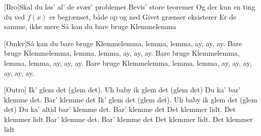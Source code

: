 \documentclass[a4paper,11pt]{article}
\begin{document}
\begin{song}
    [Bro]Skal du løs' al' de svær' problemer 
Bevis' store teoremer 
Og der kun en ting du ved
$f(x)$ er begrænset, både op og ned
Givet grænser eksisterer
Er de samme, ikke mere
Så kan du bare bruge Klemmelemma

    [Omkv]Så kan du bare bruge Klemmelemma, lemma, lemma, ay, ay, ay.
Bare bruge Klemmelemma, lemma, lemma, ay, ay, ay.
Bare bruge Klemmelemma, lemma, lemma, ay, ay, ay.
Bare bruge Klemmelemma, lemma, lemma, ay, ay, ay, ay, ay, ay.

[Outro]
Ik' glem det (glem det). Uh baby ik glem det (glem det)
Du ka' bar' klemme det. Bar' klemme det
Ik' glem det (glem det). Uh baby ik glem det (glem det)
Du ka' altid bar' klemme det. Bar' klemme det
Det klemmer lidt. Det klemmer lidt
Bar' klemme det. Bar' klemme det
Det klemmer lidt. Det klemmer lidt


\end{song}
\end{document}
